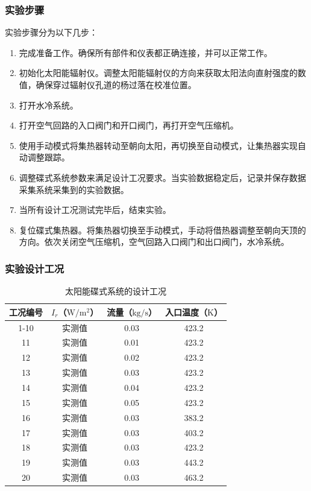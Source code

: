 \subsubsection{实验步骤}
实验步骤分为以下几步：
\begin{enumerate}[label=(\arabic*)]
	\item 完成准备工作。确保所有部件和仪表都正确连接，并可以正常工作。
	\item 初始化太阳能辐射仪。调整太阳能辐射仪的方向来获取太阳法向直射强度的数值，确保穿过辐射仪孔道的杨过落在校准位置。
	\item 打开水冷系统。
	\item 打开空气回路的入口阀门和开口阀门，再打开空气压缩机。
	\item 使用手动模式将集热器转动至朝向太阳，再切换至自动模式，让集热器实现自动调整跟踪。
	\item 调整碟式系统参数来满足设计工况要求。当实验数据稳定后，记录并保存数据采集系统采集到的实验数据。
	\item 当所有设计工况测试完毕后，结束实验。 
	\item 复位碟式集热器。将集热器切换至手动模式，手动将借热器调整至朝向天顶的方向。依次关闭空气压缩机，空气回路入口阀门和出口阀门，水冷系统。
\end{enumerate}

\subsubsection{实验设计工况}

\begin{table}[htbp]
\setlength{\abovecaptionskip}{0pt}
	\caption{太阳能碟式系统的设计工况}
	\centering
	\begin{tabular}{cccc}
		\toprule
		工况编号	& $I_r$（$\mathrm{W/m^2}$）	&	流量（$\mathrm{kg/s}$）			&	入口温度（$\mathrm{K}$）\\
		\midrule
		1-10	&	实测值	&	0.03	&	423.2\\
		11	&	实测值	&	0.01	&	423.2\\
		12	&	实测值	&	0.02	&	423.2\\
		13	&	实测值	&	0.03	&	423.2\\
		14	&	实测值	&	0.04	&	423.2\\
		15	&	实测值	&	0.05	&	423.2\\
		16	&	实测值	&	0.03	&	383.2\\
		17	&	实测值	&	0.03	&	403.2\\
		18	&	实测值	&	0.03	&	423.2\\
		19	&	实测值	&	0.03	&	443.2\\
		20	&	实测值	&	0.03	&	463.2\\
		\bottomrule
	\end{tabular}
	\label{tab:DesignedCasesForDish}
\end{table}


